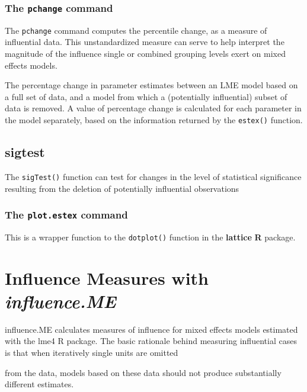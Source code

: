 \documentclass[12pt, a4paper]{article}
\begin{document}



\subsubsection*{The \texttt{pchange} command}

The \texttt{pchange} command computes the percentile change, as a measure of influential data. This unstandardized measure can
serve to help interpret the magnitude of the influence single or combined grouping levels exert on
mixed effects models. 

The percentage change in parameter estimates between an LME model based on a full set of data, and a model from which a (potentially influential)
subset of data is removed. A value of percentage change is calculated for each parameter in the
model separately, based on the information returned by the \texttt{estex()} function.

\subsection*{sigtest}

The \texttt{sigTest()} function can test for changes in the level of statistical significance resulting from
the deletion of potentially influential observations


\subsubsection*{The \texttt{plot.estex} command}
This is a wrapper function to the \texttt{dotplot()} function in the \textbf{lattice} \textbf{R} package.

\newpage

\section*{Influence Measures with \textit{influence.ME}}influence.ME calculates measures of influence for mixed effects models estimated with the lme4 R package. The
basic rationale behind measuring influential cases is that when iteratively single units are omitted

from the data, models based on these data should not produce substantially different estimates. 
\end{document}

